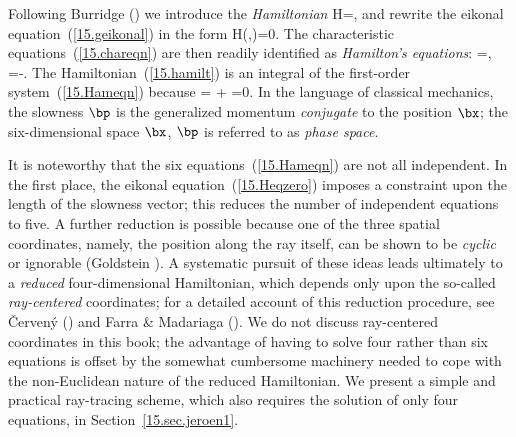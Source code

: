 Following Burridge (\citeyear{burridge76}) we introduce the {\em Hamiltonian\/}
%
%
\eq \label{15.hamilt}
H=\half[\bp\cdot\bp-v^{-2}(\bx)],
\en
and rewrite the eikonal equation~(\ref{15.geikonal}) in the form
\eq
\label{15.Heqzero}
H(\bx,\bp)=0.
\en
The characteristic equations~(\ref{15.chareqn}) are then readily
identified as {\em Hamilton's equations\/}:
%
%
\eq \label{15.Hameqn}
=,\qquad
{}=-.
\en
The Hamiltonian~(\ref{15.hamilt}) is an integral of the
first-order system~(\ref{15.Hameqn}) because
\eq
{}=
\cdot{}
+
\cdot{}=0.
\en
In the language of classical mechanics, the slowness $\bp$
is the generalized momentum {\em conjugate\/} to the position
%
%
$\bx$; the six-dimensional space $\bx$, $\bp$ is referred
to as {\em phase space\/}.
%

It is noteworthy that the six equations~(\ref{15.Hameqn})
are not all independent.  In the first place, the eikonal
equation~(\ref{15.Heqzero}) imposes a constraint upon the
length of the slowness vector; this
reduces the number of independent equations to five.
A further reduction is possible because one of the
three spatial coordinates, namely, the position along
the ray itself, can be shown to be {\em cyclic\/} or
%
ignorable (Goldstein \citeyear{goldstein80}).
A systematic pursuit of these ideas leads
ultimately to a {\em reduced\/} four-dimensional
Hamiltonian, which depends only upon the so-called
{\em ray-centered\/} coordinates; for a detailed account
%
of this reduction procedure, see \v{C}erven\'{y} (\citeyear{cerveny85})
and Farra \& Madariaga (\citeyear{farra&madariaga87}).
We do not discuss ray-centered coordinates in this book;
the advantage of having to solve four rather than six
equations is offset by the somewhat cumbersome machinery
needed to cope with the non-Euclidean nature of the reduced
Hamiltonian.  We present a simple and practical ray-tracing
scheme, which also requires the solution of only four equations,
in Section~\ref{15.sec.jeroen1}.
%

\renewcommand{\thesubsection}{$\!\!\!\raise1.3ex\hbox{$\star$}\!\!$
\arabic{chapter}.\arabic{section}.\arabic{subsection}}
